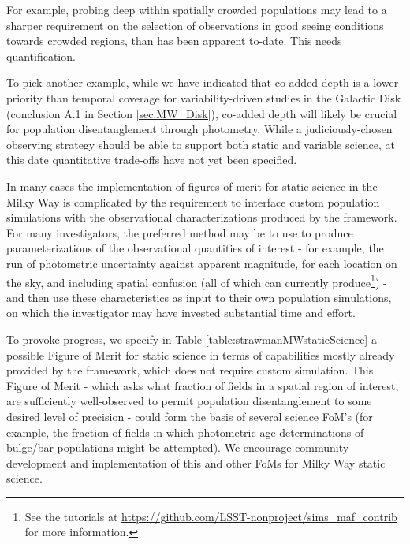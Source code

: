   For example, probing deep within spatially crowded
  populations may lead to a sharper requirement on the selection of
  observations in good seeing conditions towards crowded regions, than
  has been apparent to-date. This needs quantification. 

  To pick another example, while we have indicated that co-added
  depth is a lower priority than temporal coverage for
  variability-driven studies in the Galactic Disk (conclusion A.1 in
  Section \ref{sec:MW_Disk}), co-added depth will likely be crucial for
  population disentanglement through photometry. While a
  judiciously-chosen observing strategy should be able to support both
  static and variable science, at this date quantitative trade-offs have not yet been specified.

  In many cases the implementation of figures of merit for static
  science in the Milky Way is complicated by the requirement to
  interface custom population simulations with the observational
  characterizations produced by the \MAF framework. For many
  investigators, the preferred method may be to use \MAF to produce
  parameterizations of the observational quantities of interest - for
  example, the run of photometric uncertainty against apparent
  magnitude, for each location on the sky, and including spatial
  confusion (all of which \MAF can currently produce\footnote{See the tutorials at \url{https://github.com/LSST-nonproject/sims_maf_contrib} for more information.}) - and then use
  these characteristics as input to their own population simulations,
  on which the investigator may have invested substantial time and
  effort.

  To provoke progress, we specify in Table
  \ref{table:strawmanMWstaticScience} a possible Figure of Merit for
  static science in terms of capabilities mostly already provided by
  the \MAF framework, which does not require custom simulation. This
  Figure of Merit - which asks what fraction of fields in a spatial
  region of interest, are sufficiently well-observed to permit
  population disentanglement to some desired level of precision -
  could form the basis of several science FoM's (for example, the
  fraction of fields in which photometric age determinations of
  bulge/bar populations might be attempted). We encourage community
  development and implementation of this and other FoMs for Milky Way
  static science.

